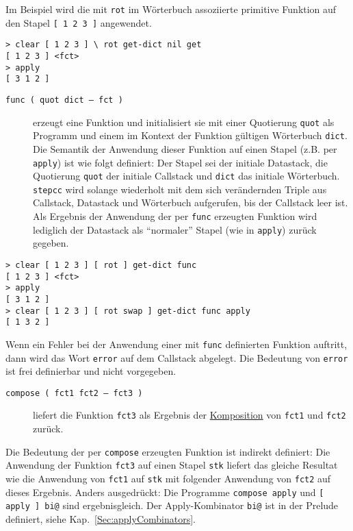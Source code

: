 Im Beispiel wird die mit \verb|rot| im Wörterbuch assoziierte primitive Funktion auf den Stapel \verb|[ 1 2 3 ]| angewendet.

\begin{verbatim}
> clear [ 1 2 3 ] \ rot get-dict nil get
[ 1 2 3 ] <fct>
> apply
[ 3 1 2 ]
\end{verbatim}

\begin{description}
\item[\texttt{func ( quot dict -- fct )}] erzeugt eine Funktion und initialisiert sie mit einer Quotierung \verb|quot| als Programm und einem im Kontext der Funktion gültigen Wörterbuch \verb|dict|. Die Semantik der Anwendung dieser Funktion auf einen Stapel (z.B. per \verb|apply|) ist wie folgt definiert: Der Stapel sei der initiale Datastack, die Quotierung \verb|quot| der initiale Callstack und \verb|dict| das initiale Wörterbuch. \verb|stepcc| wird solange wiederholt mit dem sich verändernden Triple aus Callstack, Datastack und Wörterbuch aufgerufen, bis der Callstack leer ist. Als Ergebnis der Anwendung der per \verb|func| erzeugten Funktion wird lediglich der Datastack als "`normaler"' Stapel (wie in \verb|apply|) zurück gegeben.
%
\end{description}

\begin{verbatim}
> clear [ 1 2 3 ] [ rot ] get-dict func
[ 1 2 3 ] <fct>
> apply
[ 3 1 2 ]
> clear [ 1 2 3 ] [ rot swap ] get-dict func apply
[ 1 3 2 ]
\end{verbatim}

Wenn ein Fehler bei der Anwendung einer mit \verb|func| definierten Funktion auftritt, dann wird das Wort \verb|error| auf dem Callstack abgelegt. Die Bedeutung von \verb|error| ist frei definierbar und nicht vorgegeben.


\begin{description}
\item[\texttt{compose ( fct1 fct2 -- fct3 )}] liefert die Funktion \verb|fct3| als Ergebnis der \href{http://de.wikipedia.org/wiki/Komposition_(Mathematik)}{Komposition} von \verb|fct1| und \verb|fct2| zurück.
\end{description}

Die Bedeutung der per \verb|compose| erzeugten Funktion ist indirekt definiert: Die Anwendung der Funktion \verb|fct3| auf einen Stapel \verb|stk| liefert das gleiche Resultat wie die Anwendung von \verb|fct1| auf \verb|stk| mit folgender Anwendung von \verb|fct2| auf dieses Ergebnis. Anders ausgedrückt: Die Programme \verb|compose apply| und \verb|[ apply ] bi@| sind ergebnisgleich. Der Apply-Kombinator \verb|bi@| ist in der Prelude definiert, siehe Kap.~\ref{Sec:applyCombinators}.

